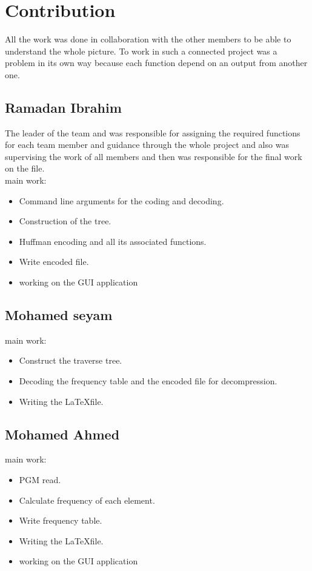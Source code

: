 \documentclass[14 pt,a4paper,double column]{article}
\begin{document}
       
   
\section{Contribution}
All the work was done in collaboration with the other members to be able to understand the whole picture. To work in such a connected project was a problem in its own way because each function depend on an output from another one.  

\subsection{Ramadan Ibrahim}
The leader of the team and was responsible for assigning the required functions for each team member and guidance through the whole project and also was supervising the work of all members and then was responsible for the final work on the file.\\
main work:
\begin{itemize}
    \item Command line arguments for the coding and decoding.
    \item Construction of the tree.
    \item Huffman encoding and all its associated functions.
    \item Write encoded file.
    \item working on the GUI application
    
\end{itemize}


\subsection{Mohamed seyam}
main work:
\begin{itemize}
    \item Construct the traverse tree.
    \item Decoding the frequency table and the encoded file for decompression.
    \item Writing the \LaTeX file.
\end{itemize}


\subsection{Mohamed Ahmed}
main work:
\begin{itemize}
    \item PGM read.
    \item Calculate frequency  of each element. 
    \item Write frequency table.
    \item Writing the \LaTeX file.
    \item working on the GUI application
\end{itemize}
\end{document}
